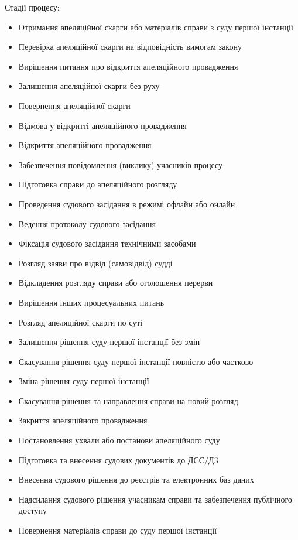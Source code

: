 \documentclass{article}
\begin{document}
Стадії процесу:

\begin{itemize}
    \item Отримання апеляційної скарги або матеріалів справи з суду першої інстанції
    \item Перевірка апеляційної скарги на відповідність вимогам закону
    \item Вирішення питання про відкриття апеляційного провадження
    \item Залишення апеляційної скарги без руху
    \item Повернення апеляційної скарги
    \item Відмова у відкритті апеляційного провадження
    \item Відкриття апеляційного провадження
    \item Забезпечення повідомлення (виклику) учасників процесу
    \item Підготовка справи до апеляційного розгляду
    \item Проведення судового засідання в режимі офлайн або онлайн
    \item Ведення протоколу судового засідання
    \item Фіксація судового засідання технічними засобами
    \item Розгляд заяви про відвід (самовідвід) судді
    \item Відкладення розгляду справи або оголошення перерви
    \item Вирішення інших процесуальних питань
    \item Розгляд апеляційної скарги по суті
    \item Залишення рішення суду першої інстанції без змін
    \item Скасування рішення суду першої інстанції повністю або частково
    \item Зміна рішення суду першої інстанції
    \item Скасування рішення та направлення справи на новий розгляд
    \item Закриття апеляційного провадження
    \item Постановлення ухвали або постанови апеляційного суду
    \item Підготовка та внесення судових документів до ДСС/Д3
    \item Внесення судового рішення до реєстрів та електронних баз даних
    \item Надсилання судового рішення учасникам справи та забезпечення публічного доступу
    \item Повернення матеріалів справи до суду першої інстанції
\end{itemize}
\end{document}
